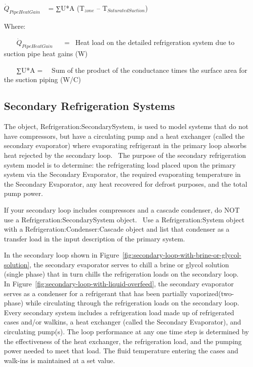 \({\dot Q_{PipeHeatGain}}\) ~ = ∑U*A (T\(_{zone}\) -- T\(_{SaturatedSuction}\))

Where:

~~~ \({\dot Q_{PipeHeatGain}}\) ~~ = ~Heat load on the detailed refrigeration system due to suction pipe heat gains (W)

~~~ ∑U*A = ~~Sum of the product of the conductance times the surface area for the suction piping (W/C)

\subsection{Secondary Refrigeration Systems}\label{secondary-refrigeration-systems}

The object, Refrigeration:SecondarySystem, is used to model systems that do not have compressors, but have a circulating pump and a heat exchanger (called the secondary evaporator) where evaporating refrigerant in the primary loop absorbs heat rejected by the secondary loop.~ The purpose of the secondary refrigeration system model is to determine: the refrigerating load placed upon the primary system via the Secondary Evaporator, the required evaporating temperature in the Secondary Evaporator, any heat recovered for defrost purposes, and the total pump power.

If your secondary loop includes compressors and a cascade condenser, do NOT use a Refrigeration:SecondarySystem object.~ Use a Refrigeration:System object with a Refrigeration:Condenser:Cascade object and list that condenser as a transfer load in the input description of the primary system.

In the secondary loop shown in Figure~\ref{fig:secondary-loop-with-brine-or-glycol-solution}, the secondary evaporator serves to chill a brine or glycol solution (single phase) that in turn chills the refrigeration loads on the secondary loop.~ In Figure~\ref{fig:secondary-loop-with-liquid-overfeed}, the secondary evaporator serves as a condenser for a refrigerant that has been partially vaporized(two-phase) while circulating through the refrigeration loads on the secondary loop. Every secondary system includes a refrigeration load made up of refrigerated cases and/or walkins, a heat exchanger (called the Secondary Evaporator), and circulating pump(s). The loop performance at any one time step is determined by the effectiveness of the heat exchanger, the refrigeration load, and the pumping power needed to meet that load. The fluid temperature entering the cases and walk-ins is maintained at a set value.

